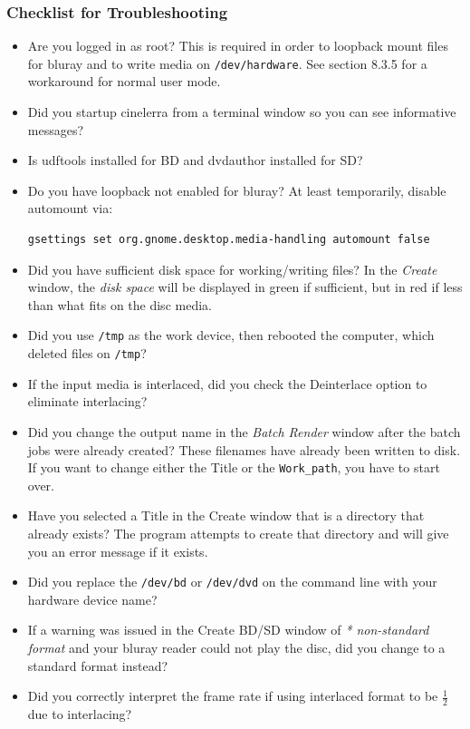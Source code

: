 \subsubsection*{Checklist for Troubleshooting}
\label{ssub:checklist_troubleshooting}

\begin{itemize}
    \item Are you logged in as root?  This is required in order to loopback mount files for bluray and to write media on \texttt{/dev/hardware}.  See section 8.3.5  for a workaround for normal user mode.
    \item Did you startup cinelerra from a terminal window so you can see informative messages?
    \item Is udftools installed for BD and dvdauthor installed for SD?
    \item Do you have loopback not enabled for bluray?  At least temporarily, disable automount via:
    \begin{lstlisting}[language=bash]
    gsettings set org.gnome.desktop.media-handling automount false
    \end{lstlisting}
    \item Did you have sufficient disk space for working/writing files?  In the \textit{Create} window, the \textit{disk space} will be displayed in green if sufficient, but in red if less than what fits on the disc media.
    \item Did you use \texttt{/tmp} as the work device, then rebooted the computer, which deleted files on \texttt{/tmp}?
    \item If the input media is interlaced, did you check the Deinterlace option to eliminate interlacing?
    \item Did you change the output name in the \textit{Batch Render} window after the batch jobs were already created? These filenames have already been written to disk. If you want to change either the Title or the \texttt{Work\_path}, you have to start over.
    \item Have you selected a Title in the Create window that is a directory that already exists? The program attempts to create that directory and will give you an error message if it exists.
    \item Did you replace the \texttt{/dev/bd} or \texttt{/dev/dvd} on the command line with your hardware device name?
    \item If a warning was issued in the Create BD/SD window of \textit{* non-standard format} and your bluray reader could not play the disc, did you change to a standard format instead?
    \item Did you correctly interpret the frame rate if using interlaced format to be $\frac{1}{2}$ due to interlacing?
\end{itemize}

